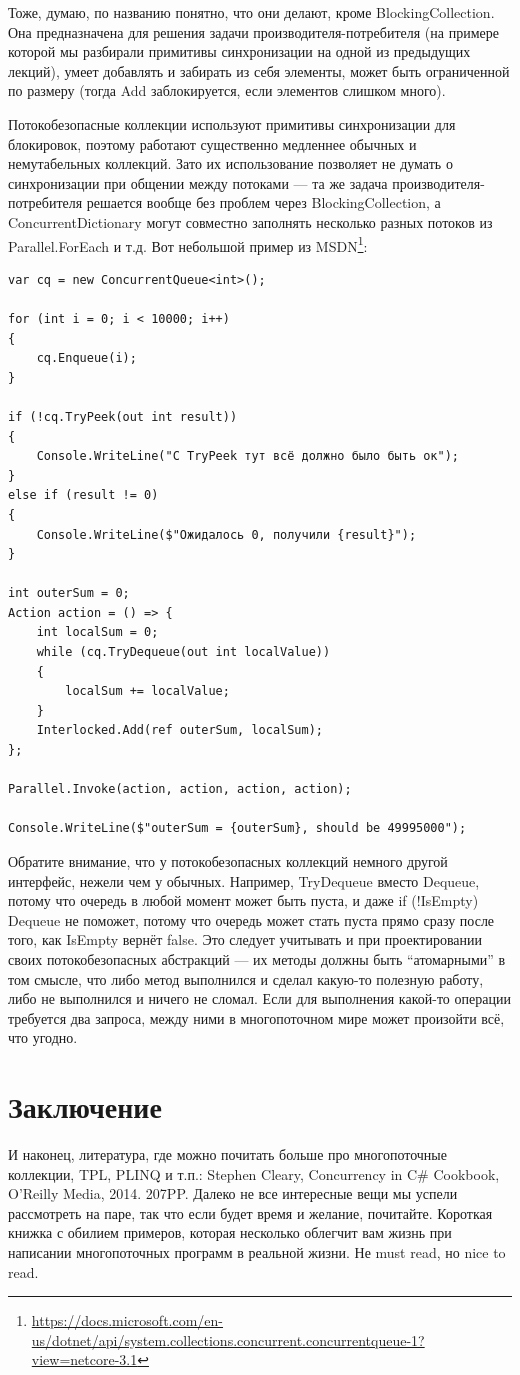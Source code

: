 \documentclass[a5paper]{article}
\begin{document}
Тоже, думаю, по названию понятно, что они делают, кроме BlockingCollection. Она предназначена для решения задачи производителя-потребителя (на примере которой мы разбирали примитивы синхронизации на одной из предыдущих лекций), умеет добавлять и забирать из себя элементы, может быть ограниченной по размеру (тогда Add заблокируется, если элементов слишком много).

Потокобезопасные коллекции используют примитивы синхронизации для блокировок, поэтому работают существенно медленнее обычных и немутабельных коллекций. Зато их использование позволяет не думать о синхронизации при общении между потоками --- та же задача производителя-потребителя решается вообще без проблем через BlockingCollection, а ConcurrentDictionary могут совместно заполнять несколько разных потоков из Parallel.ForEach и т.д. Вот небольшой пример из MSDN\footnote{\url{https://docs.microsoft.com/en-us/dotnet/api/system.collections.concurrent.concurrentqueue-1?view=netcore-3.1}}:

\begin{verbatim}
var cq = new ConcurrentQueue<int>();

for (int i = 0; i < 10000; i++) 
{
    cq.Enqueue(i);
}

if (!cq.TryPeek(out int result))
{
    Console.WriteLine("С TryPeek тут всё должно было быть ок");
}
else if (result != 0)
{
    Console.WriteLine($"Ожидалось 0, получили {result}");
}

int outerSum = 0;
Action action = () => {
    int localSum = 0;
    while (cq.TryDequeue(out int localValue)) 
    {
        localSum += localValue;
    }
    Interlocked.Add(ref outerSum, localSum);
};

Parallel.Invoke(action, action, action, action);

Console.WriteLine($"outerSum = {outerSum}, should be 49995000");
\end{verbatim}

Обратите внимание, что у потокобезопасных коллекций немного другой интерфейс, нежели чем у обычных. Например, TryDequeue вместо Dequeue, потому что очередь в любой момент может быть пуста, и даже if (!IsEmpty) Dequeue не поможет, потому что очередь может стать пуста прямо сразу после того, как IsEmpty вернёт false. Это следует учитывать и при проектировании своих потокобезопасных абстракций --- их методы должны быть ``атомарными'' в том смысле, что либо метод выполнился и сделал какую-то полезную работу, либо не выполнился и ничего не сломал. Если для выполнения какой-то операции требуется два запроса, между ними в многопоточном мире может произойти всё, что угодно.

\section{Заключение}

И наконец, литература, где можно почитать больше про многопоточные коллекции, TPL, PLINQ и т.п.: Stephen Cleary, Concurrency in C\# Cookbook, O'Reilly Media, 2014. 207PP. Далеко не все интересные вещи мы успели рассмотреть на паре, так что если будет время и желание, почитайте. Короткая книжка с обилием примеров, которая несколько облегчит вам жизнь при написании многопоточных программ в реальной жизни. Не must read, но nice to read.
\end{document}
